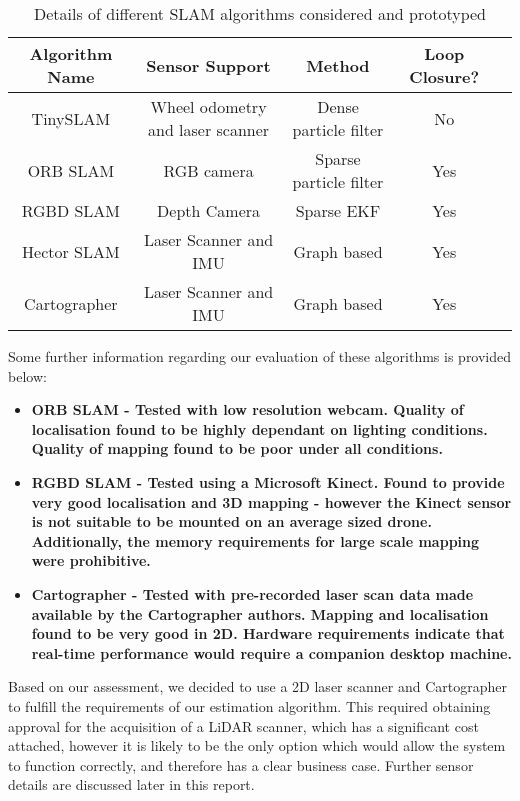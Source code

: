 \documentclass[capstone_report.tex]{subfiles}
\begin{document}
\begin{table}[H]
	\centering
 	\begin{tabular}{|c|c|c|c|c|}
 		\hline
 		\bf{Algorithm Name}	&	\bf{Sensor Support}	&	\bf{Method}	&	\bf{Loop Closure?}\\
 		\hline
 		TinySLAM		&	Wheel odometry and laser scanner	&	Dense particle filter &	No\\	
 		\hline
 		ORB SLAM 	&		RGB camera & Sparse particle filter & Yes \\
 		\hline
 		RGBD SLAM & Depth Camera & Sparse EKF & Yes\\
 		\hline
 		Hector SLAM & Laser Scanner and IMU & Graph based & Yes\\
 		\hline
 		Cartographer & Laser Scanner and IMU & Graph based & Yes\\
 		\hline
 	\end{tabular}
 	\caption{Details of different SLAM algorithms considered and prototyped\label{tab:slamAlg}}
\end{table}

Some further information regarding our evaluation of these algorithms is provided below:
\begin{itemize}
	\item \bf{ORB SLAM} \normalfont- Tested with low resolution webcam. Quality of localisation found to be highly dependant on lighting conditions. Quality of mapping found to be poor under all conditions.
 	\item \bf{RGBD SLAM} \normalfont- Tested using a Microsoft Kinect. Found to provide very good localisation and 3D mapping - however the Kinect sensor is not suitable to be mounted on an average sized drone. Additionally, the memory requirements for large scale mapping were prohibitive.
 	\item \bf{Cartographer} \normalfont- Tested with pre-recorded laser scan data made available by the Cartographer authors\cite{cartdata}. Mapping and localisation found to be very good in 2D. Hardware requirements indicate that real-time performance would require a companion desktop machine.
\end{itemize}

Based on our assessment, we decided to use a 2D laser scanner and Cartographer to fulfill the requirements of our estimation algorithm. This required obtaining approval for the acquisition of a LiDAR scanner, which has a significant cost attached, however it is likely to be the only option which would allow the system to function correctly, and therefore has a clear business case. Further sensor details are discussed later in this report.\\
\end{document}
